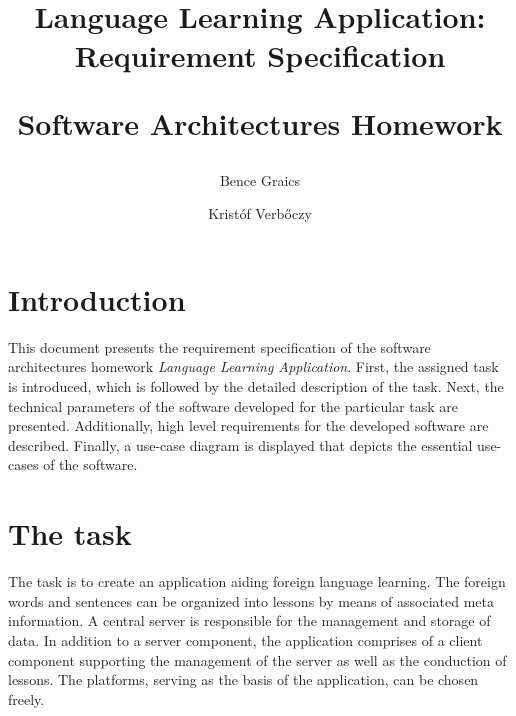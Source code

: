 \documentclass[a4paper]{article}
\begin{document}
	
	\newcommand{\specialcell}[2][c]{%
		\begin{tabular}[#1]{@{}l@{}}#2\end{tabular}}
	
	\newenvironment*{mytable}[3]{
		\begin{table}[htbp]	
			\caption{#1}          
			\label{tab:#2}            
			\center%
			\begin{tabular}{#3}
			}
			{
			\end{tabular}
		\end{table}
	}
	
	\pagestyle{plain}
	
	
	
	\nonfrenchspacing
	\setlength{\parindent}{0em}
	\setlength{\parskip}{0.45em}
	
	\title{Language Learning Application: \\ Requirement Specification \\ \begin{large}Software Architectures Homework \end{large}}
	\author{Bence Graics \and Kristóf Verbőczy}	
	\date{}
	\maketitle
	\section*{Introduction}
	This document presents the requirement specification of the software architectures homework \textsl{Language Learning Application}. First, the assigned task is introduced, which is followed by the detailed description of the task. Next, the technical parameters of the software developed for the particular task are presented. Additionally, high level requirements for the developed software are described. Finally, a use-case diagram is displayed that depicts the essential use-cases of the software.
	\section{The task}
	The task is to create an application aiding foreign language learning. The foreign words and sentences can be organized into lessons by means of associated meta information. A central server is responsible for the management and storage of data. In addition to a server component, the application comprises of a client component supporting the management of the server as well as the conduction of lessons. The platforms, serving as the basis of the application, can be chosen freely.
	
\end{document}

